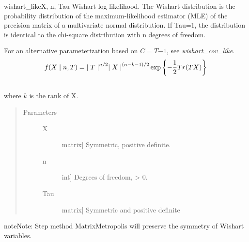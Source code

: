 \hypertarget{pymc.distributions.wishart_like}{}\begin{funcdesc}{wishart\_like}{X, n, Tau}
Wishart log-likelihood. The Wishart distribution is the probability
distribution of the maximum-likelihood estimator (MLE) of the precision
matrix of a multivariate normal distribution. If Tau=1, the distribution
is identical to the chi-square distribution with n degrees of freedom.

For an alternative parameterization based on $C=T{-1}$, see
\emph{wishart\_cov\_like}.
\begin{gather}
\begin{split}f(X \mid n, T) = {\mid T \mid}^{n/2}{\mid X \mid}^{(n-k-1)/2} \exp\left\{ -\frac{1}{2} Tr(TX) \right\}\end{split}\notag\\\begin{split}\end{split}\notag
\end{gather}
where $k$ is the rank of X.
\begin{quote}\begin{description}
\item[Parameters] \leavevmode\begin{description}
\item[X] \leavevmode{[}matrix{]}
Symmetric, positive definite.

\item[n] \leavevmode{[}int{]}
Degrees of freedom, \textgreater{} 0.

\item[Tau] \leavevmode{[}matrix{]}
Symmetric and positive definite

\end{description}

\end{description}\end{quote}

\begin{notice}{note}{Note:}
Step method MatrixMetropolis will preserve the symmetry of Wishart variables.
\end{notice}

\end{funcdesc}


